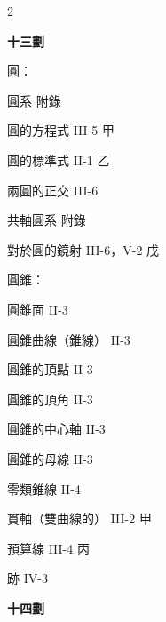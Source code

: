 \begin{multicols}{2}
\vspace{0.8em}
\begin{center}
\textbf{\large 十三劃}
\end{center}

\noindent 圓：\par
\noindent\hspace*{1.5em} 圓系 \hfill 附錄\par
\noindent\hspace*{1.5em} 圓的方程式 \hfill III-5 甲\par
\noindent\hspace*{1.5em} 圓的標準式 \hfill II-1 乙\par
\noindent\hspace*{1.5em} 兩圓的正交 \hfill III-6\par
\noindent\hspace*{1.5em} 共軸圓系 \hfill 附錄\par
\noindent\hspace*{1.5em} 對於圓的鏡射 \hfill III-6，V-2 戊\par
\noindent 圓錐：\par
\noindent\hspace*{1.5em} 圓錐面 \hfill II-3\par
\noindent\hspace*{1.5em} 圓錐曲線（錐線） \hfill II-3\par
\noindent\hspace*{1.5em} 圓錐的頂點 \hfill II-3\par
\noindent\hspace*{1.5em} 圓錐的頂角 \hfill II-3\par
\noindent\hspace*{1.5em} 圓錐的中心軸 \hfill II-3\par
\noindent\hspace*{1.5em} 圓錐的母線 \hfill II-3\par
\noindent 零類錐線 \hfill II-4\par
\noindent 貫軸（雙曲線的） \hfill III-2 甲\par
\noindent 預算線 \hfill III-4 丙\par
\noindent 跡 \hfill IV-3\par

\vspace{0.8em}
\begin{center}
\textbf{\large 十四劃}
\end{center}


\end{multicols}
